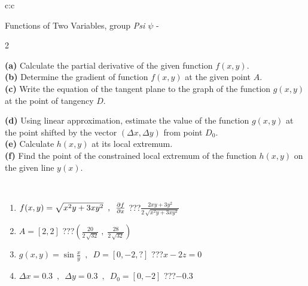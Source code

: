 \documentclass[10pt]{report}
\begin{document}
\begin{tabular}{c:c}
\begin{minipage}[c][104.5mm][t]{0.5\linewidth}
\begin{center}
\vspace{7mm}
{\huge \LARGE Functions of Two Variables, group \textit{Psi $\psi$} -}\\[5mm]
\begin{minipage}{0.95\linewidth}
\begin{center}
{\small \begin{multicols}{2} \raggedright
\textbf{(a)} Calculate the partial derivative of the given function \(f(x,y)\). \\[1mm]
\textbf{(b)} Determine the gradient of function \(f(x,y)\) at the given point \(A\). \\[1mm]
\textbf{(c)} Write the equation of the tangent plane to the graph of the function \(g(x,y)\) at the point of tangency \(D\). \par \columnbreak
\textbf{(d)} Using linear approximation, estimate the value of the function \(g(x,y)\) at the point shifted by the vector \((\Delta x, \Delta y)\) from point \(D_0\). \\[1mm]
\textbf{(e)} Calculate \(h(x,y)\) at its local extremum. \\[1mm]
\textbf{(f)} Find the point of the constrained local extremum of the function \(h(x,y)\) on the given line \(y(x)\). \\[1mm]
\end{multicols}
}
\end{center}
\end{minipage}
\\[4mm]
\begin{minipage}{0.79\linewidth}
\begin{center}
\begin{varwidth}{\linewidth}
\begin{enumerate}
\normalsizerr
\item $f(x,y) = \sqrt{x^2y + 3xy^2}\enspace , \enspace \pdv{f}{x}$\quad \dotfill\; ???\;\dotfill \quad $\frac{2xy+3y^2}{2\,\sqrt{x^2y+3xy^2}}$
\item $A = [2, 2]$\quad \dotfill\; ???\;\dotfill \quad $\left( \frac{20}{2\,\sqrt{32}} \;,\; \frac{28}{2\,\sqrt{32}} \right)$
\item $g(x,y) = \sin\frac{x}{y} \enspace , \enspace D = [0, -2, ?]$\quad \dotfill\; ???\;\dotfill \quad $x-2z=0$
\item $\Delta x = {0.3} \enspace,\enspace \Delta y = {0.3} \enspace,\enspace D_0 = [0,-2]$\quad \dotfill\; ???\;\dotfill \quad $-0.3$

\end{enumerate}
\end{varwidth}
\end{center}
\end{minipage}
\end{center}
\end{minipage}
\end{tabular}
\end{document}
